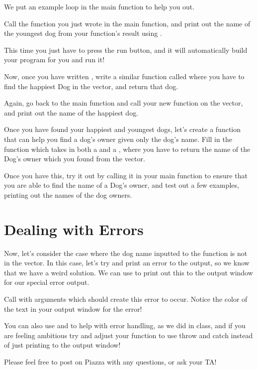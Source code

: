 \documentclass{tufte-handout}
\begin{document}
We put an example  loop in the main function to help you out.  


Call the function you just wrote in the main function, and print out the name of the youngest dog from your function's result using .  

This time you just have to press the run button, and it will automatically build your program for you and run it!

Now, once you have written , write a similar function called  where you have to find the happiest Dog in the vector, and return that dog.

Again, go back to the main function and call your new function on the  vector, and print out the name of the happiest dog.

Once you have found your happiest and youngest dogs, let's create a function that can help you find a dog's owner given only the dog's name.  Fill in the function  which takes in both a  and a , where you have to return the name of the Dog's owner which you found from the vector.

Once you have this, try it out by calling it in your main function to ensure that you are able to find the name of a Dog's owner, and test out a few examples, printing out the names of the dog owners.

\section{Dealing with Errors}

Now, let's consider the case where the dog name inputted to the  function is not in the  vector.  In this case, let's try and print an error to the output, so we know that we have a weird solution.  We can use  to print out this to the output window for our special error output.  

Call  with arguments which should create this error to occur.  Notice the color of the text in your output window for the error!  

You can also use  and  to help with error handling, as we did in class, and if you are feeling ambitious try and adjust your function to use throw and catch instead of just printing to the output window!  

Please feel free to post on Piazza with any questions, or ask your TA!  
\end{document}
